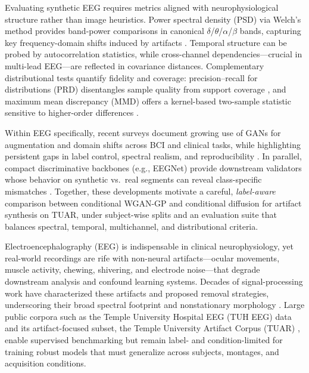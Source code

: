 \documentclass{article}
\begin{document}
Evaluating synthetic EEG requires metrics aligned with neurophysiological structure rather than image heuristics. Power spectral density (PSD) via Welch’s method provides band-power comparisons in canonical $\delta$/$\theta$/$\alpha$/$\beta$ bands, capturing key frequency-domain shifts induced by artifacts \citep{welch1967usefast}. Temporal structure can be probed by autocorrelation statistics, while cross-channel dependencies—crucial in multi-lead EEG—are reflected in covariance distances. Complementary distributional tests quantify fidelity and coverage: precision–recall for distributions (PRD) disentangles sample quality from support coverage \citep{sajjadi2018assessingprecision}, and maximum mean discrepancy (MMD) offers a kernel-based two-sample statistic sensitive to higher-order differences \citep{binkowski2018demystifyingmmd}. 

Within EEG specifically, recent surveys document growing use of GANs for augmentation and domain shifts across BCI and clinical tasks, while highlighting persistent gaps in label control, spectral realism, and reproducibility \citep{habashi2023adversarialnetworks}. In parallel, compact discriminative backbones (e.g., EEGNet) provide downstream validators whose behavior on synthetic vs.\ real segments can reveal class-specific mismatches \citep{lawhern2018eegnetcompact}. Together, these developments motivate a careful, \emph{label-aware} comparison between conditional WGAN-GP and conditional diffusion for artifact synthesis on TUAR, under subject-wise splits and an evaluation suite that balances spectral, temporal, multichannel, and distributional criteria.

Electroencephalography (EEG) is indispensable in clinical neurophysiology, yet real-world recordings are rife with non-neural artifacts—ocular movements, muscle activity, chewing, shivering, and electrode noise—that degrade downstream analysis and confound learning systems. Decades of signal-processing work have characterized these artifacts and proposed removal strategies, underscoring their broad spectral footprint and nonstationary morphology \citep{uriguen2015eegartifact}. Large public corpora such as the Temple University Hospital EEG (TUH EEG) data \citep{obeid2016tuh} and its artifact-focused subset, the Temple University Artifact Corpus (TUAR) \citep{hamid2020tuar}, enable supervised benchmarking but remain label- and condition-limited for training robust models that must generalize across subjects, montages, and acquisition conditions.
\end{document}
